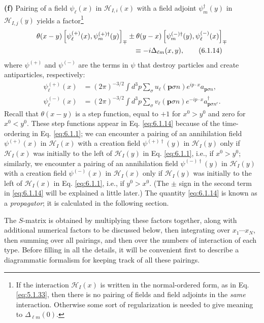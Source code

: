\noindent\textbf{(f)} Pairing of a field $\psi_\ell(x)$ in
$\mathcal H_{I,i}(x)$ with a field adjoint $\psi_m^\dagger(y)$ in
$\mathcal H_{I,j}(y)$ yields a factor\footnote{If the interaction
$\mathcal H_I(x)$ is written in the normal-ordered form, as in Eq. \eqref{eq:5.1.33},
then there is no pairing of fields and field adjoints in the \emph{same}
interaction. Otherwise some sort of regularization is needed to give meaning
to $\Delta_{\ell m}(0)$.}
\begin{align}
&\theta(x-y)
\left[\psi_\ell^{(+)}(x),\psi_m^{(+)\dagger}(y)\right]_{\mp}
\mathbin{\pm}\theta(y-x)
\left[\psi_m^{(-)\dagger}(y),\psi_\ell^{(-)}(x)\right]_{\mp}
\notag\\
&\hspace{48mm}\equiv-i\Delta_{\ell m}(x,y),
\tag{6.1.14}
\label{eq:6.1.14}
\end{align}
where $\psi^{(+)}$ and $\psi^{(-)}$ are the terms in $\psi$ that destroy
particles and create antiparticles, respectively:
\begin{align}
\psi_\ell^{(+)}(x)
&=(2\pi)^{-3/2}\int d^3p\sum_\sigma
u_\ell(\mathbf p\sigma n)e^{ip\cdot x}a_{\mathbf p\sigma n},
\tag{6.1.15}\label{eq:6.1.15}\\
\psi_\ell^{(-)}(x)
&=(2\pi)^{-3/2}\int d^3p\sum_\sigma
v_\ell(\mathbf p\sigma n)e^{-ip\cdot x}a^\dagger_{\mathbf p\sigma n^c}.
\tag{6.1.16}
\label{eq:6.1.16}
\end{align}
Recall that $\theta(x-y)$ is a step function, equal to $+1$ for $x^0>y^0$
and zero for $x^0<y^0$. These step functions appear in Eq. \eqref{eq:6.1.14} because
of the time-ordering in Eq. \eqref{eq:6.1.1}; we can encounter a pairing of an
annihilation field $\psi^{(+)}(x)$ in $\mathcal H_I(x)$ with a creation field
$\psi^{(+)\dagger}(y)$ in $\mathcal H_I(y)$ only if $\mathcal H_I(x)$ was initially
to the left of $\mathcal H_I(y)$ in Eq. \eqref{eq:6.1.1}, i.e., if $x^0>y^0$;
similarly, we encounter a pairing of an annihilation field
$\psi^{(-)\dagger}(y)$ in $\mathcal H_I(y)$ with a creation field
$\psi^{(-)}(x)$ in $\mathcal H_I(x)$ only if $\mathcal H_I(y)$ was initially
to the left of $\mathcal H_I(x)$ in Eq. \eqref{eq:6.1.1}, i.e., if $y^0>x^0$. (The
$\pm$ sign in the second term in \eqref{eq:6.1.14} will be explained a little later.)
The quantity \eqref{eq:6.1.14} is known as a \emph{propagator}; it is calculated in the
following section.

The $S$-matrix is obtained by multiplying these factors together, along with
additional numerical factors to be discussed below, then integrating over
$x_1\cdots x_N$, then summing over all pairings, and then over the numbers of
interaction of each type. Before filling in all the details, it will be
convenient first to describe a diagrammatic formalism for keeping track of all
these pairings.

